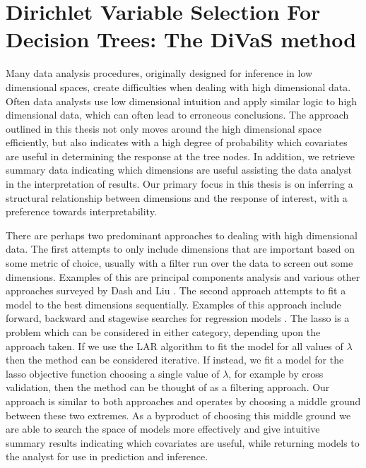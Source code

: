  \section{Dirichlet Variable Selection For Decision Trees: The DiVaS method}
\label{ch:var_select}

Many data analysis procedures, originally designed for inference in low dimensional spaces, create difficulties when dealing with high dimensional data.  Often data analysts use low dimensional intuition and apply similar logic to high dimensional data, which can often lead to erroneous conclusions. The approach outlined in this thesis not only moves around the high dimensional space efficiently, but also indicates with a high degree of probability which covariates are useful in determining the response at the tree nodes. In addition, we retrieve summary data indicating which dimensions are useful assisting the data analyst in the interpretation of results. Our primary focus in this thesis is on inferring a structural relationship between dimensions and the response of interest, with a preference towards interpretability. 

There are perhaps two predominant approaches to dealing with high dimensional data. The first attempts to only include dimensions that are important based on some metric of choice, usually with a filter run over the data to screen out some dimensions. Examples of this are principal components analysis \cite{tipping1999probabilistic} and various other approaches surveyed by Dash and Liu \cite{dash1997feature}. The second approach attempts to fit a model to the best dimensions sequentially. Examples of this approach include forward, backward and stagewise searches for regression models \cite{miller1984selection} \cite{myers1990classical} \cite{berk1978comparing}. The lasso \cite{tibshirani1996regression} is a problem which can be considered in either category, depending upon the approach taken. If we use the LAR algorithm to fit the model for all values of $\lambda$ then the method can be considered iterative. If instead, we fit a model for the lasso objective function choosing a single value of $\lambda$, for example by cross validation, then the method can be thought of as a filtering approach. Our approach is similar to both approaches and operates by choosing a middle ground between these two extremes. As a byproduct of choosing this middle ground we are able to search the space of models more effectively and give intuitive summary results indicating which covariates are useful, while returning models to the analyst for use in prediction and inference. 

